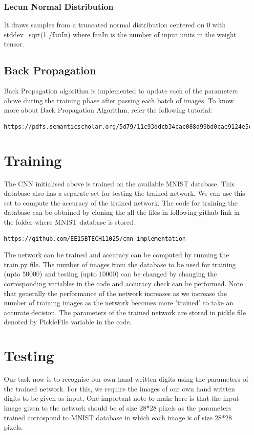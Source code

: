 \documentclass[journal,12pt,twocolumn]{IEEEtran}
\begin{document}
\subsubsection{Lecun Normal Distribution}
It draws samples from a truncated normal distribution centered on 0 with stddev=sqrt(1 /fanIn) where fanIn is the number of input units in the weight tensor.

\subsection{Back Propagation}
Back Propagation algorithm is implemented to update each of the parameters above during the training phase after passing each batch of images. To know more about Back Propagation Algorithm, refer the following tutorial:
\begin{lstlisting}
https://pdfs.semanticscholar.org/5d79/11c93ddcb34cac088d99bd0cae9124e5dcd1.pdf\end{lstlisting}

\section{Training}
The CNN initialised above is trained on the available MNIST database. This database also has a separate set for testing the trained network. We can use this set to compute the accuracy of the trained network. The code for training the database can be obtained by cloning the all the files in following github link in the folder where MNIST database is stored.
\begin{lstlisting}
https://github.com/EE15BTECH11025/cnn_implementation
\end{lstlisting}

The network can be trained and accuracy can be computed by running the train.py file. The number of images from the database to be used for training (upto 50000) and testing (upto 10000) can be changed by changing the corrosponding variables in the code and accuracy check can be performed. Note that generally the performance of the network increases as we increase the number of training images as the network becomes more 'trained' to take an accurate decision. The parameters of the trained network are stored in pickle file denoted by PickleFile variable in the code.

\section{Testing}
Our task now is to recognise our own hand written digits using the parameters of the trained network. For this, we require the images of our own hand written digits to be given as input. One important note to make here is that the input image given to the network should be of size 28*28 pixels as the parameters trained corrospond to MNIST database in which each image is of size 28*28 pixels.
\end{document}
